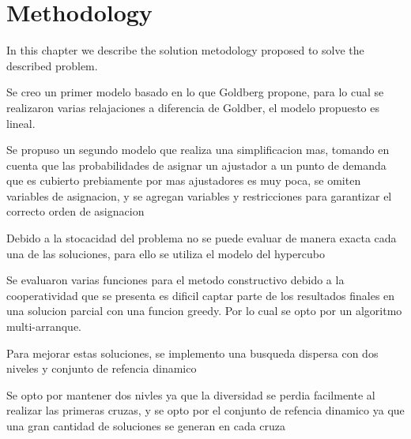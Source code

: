 \chapter{Methodology}
In this chapter
we describe the solution metodology proposed
to solve the described problem.

Se creo un primer modelo
basado en lo que Goldberg propone,
para lo cual se realizaron
varias relajaciones
a diferencia de Goldber,
el modelo propuesto es lineal.

Se propuso un segundo modelo
que realiza una simplificacion mas,
tomando en cuenta que
las probabilidades de asignar
un ajustador 
a un punto de demanda
que es cubierto prebiamente por mas ajustadores
es muy poca,
se omiten variables de asignacion,
y se agregan variables y restricciones
para garantizar
el correcto orden de asignacion

Debido a la stocacidad del problema
no se puede evaluar de manera exacta
cada una de las soluciones,
para ello se utiliza el modelo del hypercubo

Se evaluaron varias funciones
para el metodo constructivo
debido a la cooperatividad que se presenta
es dificil
captar parte de los resultados finales
en una solucion parcial
con una funcion greedy.
Por lo cual se opto
por un algoritmo multi-arranque.

Para mejorar estas soluciones,
se implemento una busqueda dispersa
con dos niveles y conjunto de refencia dinamico

Se opto por mantener dos nivles
ya que
la diversidad
se perdia facilmente
al realizar las primeras cruzas,
y se opto
por el conjunto de refencia dinamico
ya que una gran cantidad de soluciones se generan
en cada cruza
